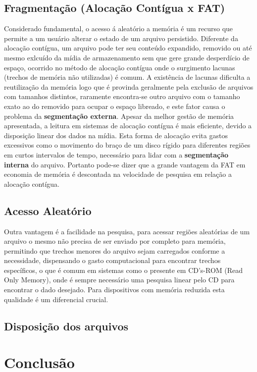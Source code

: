 \documentclass{article}
\begin{document}
\subsection{Fragmentação (Alocação Contígua x FAT)}
Considerado fundamental, o acesso á aleatório a memória é um recurso que permite a um usuário alterar o estado de um arquivo persistido. Diferente da alocação contígua, um arquivo pode ter seu conteúdo expandido, removido ou até mesmo exlcuído da mídia de armazenamento sem que gere grande desperdício de espaço, ocorrido no método de alocação contígua onde o surgimento lacunas (trechos de memória não utilizadas) é comum. A existência de lacunas dificulta a reutilização da memória logo que é provinda geralmente pela exclusão de arquivos com tamanhos distintos, raramente encontra-se outro arquivo com o tamanho exato ao do removido para ocupar o espaço libreado, e este fator causa o problema da \textbf{segmentação externa}.
Apesar da melhor gestão de memória apresentada, a leitura em sistemas de alocação contígua é mais eficiente, devido a disposição linear dos dados na mídia. Esta forma de alocação evita gastos excessivos como o movimento do braço de um disco rígido para diferentes regiões em curtos intervalos de tempo, necessário para lidar com a \textbf{segmentação interna} do arquivo. Portanto pode-se dizer que a grande vantagem da FAT em economia de memória é descontada na velocidade de pesquisa em relação a alocação contígua.
\subsection{Acesso Aleatório}
Outra vantagem é a facilidade na pesquisa, para acessar regiões aleatórias de um arquivo o mesmo não precisa de ser enviado por completo para memória, permitindo que trechos menores do arquivo sejam carregados conforme a necessidade, dispensando o gasto computacional para encontrar trechos específicos, o que é comum em sistemas como o presente em CD's-ROM (Read Only Memory), onde é sempre necessário uma pesquisa linear pelo CD para encontrar o dado desejado. Para dispositivos com memória reduzida esta qualidade é um diferencial crucial.
\subsection{Disposição dos arquivos}
\section{Conclusão}
    
\end{document}
